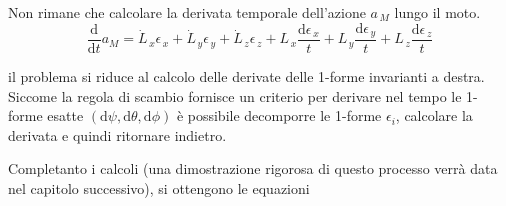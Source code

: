 \documentclass[11pt]{report}
\theoremstyle{plain}
\theoremstyle{definition}
\theoremstyle{remark}
\begin{document}
Non rimane che calcolare la derivata temporale dell'azione $a_{\, M}$ lungo il moto.
\begin{displaymath}
\dfrac{\textrm{d}}{\textrm{d}t} a_{M} = \dot{L}_{\, x}\epsilon_{\, x} + \dot{L}_{\, y}\epsilon_{\, y} + \dot{L}_{\, z}\epsilon_{\, z} + L_{\, x}\dfrac{\textrm{d}\epsilon_{\, x}}{t} + L_{\, y}\dfrac{\textrm{d}\epsilon_{\, y}}{t} + L_{\, z}\dfrac{\textrm{d}\epsilon_{\, z}}{t}
\end{displaymath}

il problema si riduce al calcolo delle derivate delle 1-forme invarianti a destra.
Siccome la regola di scambio fornisce un criterio per derivare nel tempo le 1-forme esatte $(\textrm{d} \psi, \textrm{d} \theta , \textrm{d} \phi )$ è possibile decomporre le 1-forme $\epsilon_{i} $, calcolare la derivata e quindi ritornare indietro.

Completanto i calcoli (una dimostrazione rigorosa di questo processo verrà data nel capitolo successivo), si ottengono le equazioni
\end{document}
